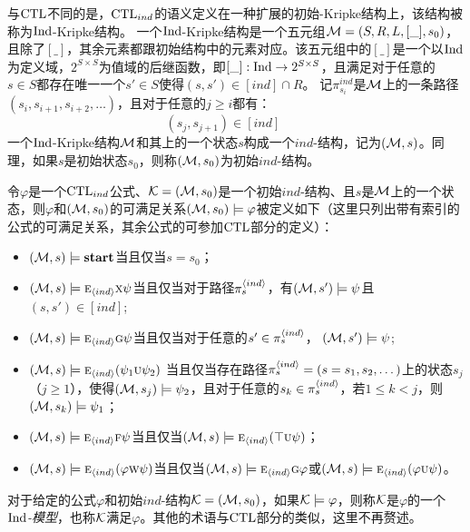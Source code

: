 与$\textrm{CTL}$不同的是，$\textrm{CTL}_{ind}$的语义定义在一种扩展的初始-Kripke结构上，该结构被称为$\textrm{Ind}$-Kripke结构。
一个$\textrm{Ind}$-Kripke结构是一个五元组${\cal M}=(S,R,L,[\_],s_0)$，且除了$[\_]$，其余元素都跟初始结构中的元素对应。该五元组中的$[\_]$是一个以$\textrm{Ind}$为定义域，$2^{S\times S}$为值域的后继函数，即$[\_]:\textrm{Ind} \rightarrow 2^{S\times S}$，且满足对于任意的$s\in S$都存在唯一一个$s'\in S$使得$(s,s')\in [ind]\cap R$。
记$\pi_{s_i}^{ind}$是${\cal M}$上的一条路径$(s_i,s_{i+1},s_{i+2},\dots)$，且对于任意的$j\ge i$都有：
\[
(s_j,s_{j+1}) \in [ind] \qquad 
\]
一个$\textrm{Ind}$-Kripke结构${\cal M}$和其上的一个状态$s$构成一个$ind$-结构，记为$({\cal M},s)$。同理，如果$s$是初始状态$s_0$，则称$({\cal M},s_0)$为初始$ind$-结构。

令$\varphi$是一个$\textrm{CTL}_{ind}$公式、${\cal K}=({\cal M},s_0)$是一个初始$ind$-结构、且$s$是${\cal M}$上的一个状态，则$\varphi$和$({\cal M},s_0)$的可满足关系$({\cal M},s_0)\models \varphi$被定义如下（这里只列出带有索引的公式的可满足关系，其余公式的可参加$\textrm{CTL}$部分的定义）：
\begin{itemize}
	\item $({\cal M},s) \models \textbf{start}$当且仅当$s=s_0$；
	\item $({\cal M},s)\models \textsc{e}_{{\langle{ind}\rangle}} \textsc{x} \psi$当且仅当对于路径$\pi_{s}^{{\langle{ind}\rangle}}$，有$({\cal M}, s')\models \psi$且$(s, s') \in [ind]$;
	\item $({\cal M},s)\models \textsc{e}_{{\langle{ind}\rangle}}\textsc{g}\psi$当且仅当对于任意的$s' \in  \pi_{s}^{{\langle{ind}\rangle}}$，%
	$({\cal M},s') \models \psi$;
	\item $({\cal M},s)\models \textsc{e}_{{\langle{ind}\rangle}}(\psi_1\textsc{u}\psi_2)$
	当且仅当存在路径$\pi_{s}^{{\langle{ind}\rangle}} = (s=s_1, s_2, \dots)$上的状态$s_j$（$j\ge 1$），使得$({\cal M},s_j) \models \psi_2$，且对于任意的$s_k \in \pi_{s}^{{\langle{ind}\rangle}}$，若$1\leq k < j$，则$({\cal M},s_k) \models \psi_1$；
	\item $({\cal M},s) \models \textsc{e}_{{\langle{ind}\rangle}} \textsc{f} \psi$当且仅当$({\cal M},s) \models \textsc{e}_{{\langle{ind}\rangle}}(\top \textsc{u}\psi)$；
	\item $({\cal M},s)\models \textsc{e}_{{\langle{ind}\rangle}}(\varphi\textsc{w}\psi)$当且仅当$({\cal M},s) \models \textsc{e}_{{\langle{ind}\rangle}}\textsc{g} \varphi$或$({\cal M},s)\models \textsc{e}_{{\langle{ind}\rangle}}(\varphi\textsc{u}\psi)$。
\end{itemize}

对于给定的公式$\varphi$和初始$ind$-结构${\cal K}=({\cal M},s_0)$，如果${\cal K} \models \varphi$，则称${\cal K}$是$\varphi$的一个\emph{$\textrm{Ind}$-模型}，也称${\cal K}$满足$\varphi$。其他的术语与$\textrm{CTL}$部分的类似，这里不再赘述。

